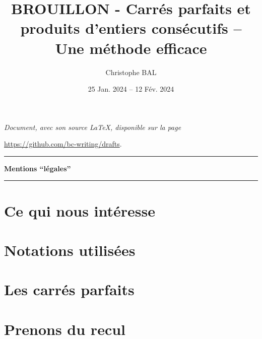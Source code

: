 \documentclass[12pt]{amsart}
\newcommand\contentdir{\jobname}
\begin{document}
\title{BROUILLON - Carrés parfaits et produits d'entiers consécutifs -- Une méthode efficace}
\author{Christophe BAL}
\date{25 Jan. 2024 -- 12 Fév. 2024}

\maketitle

\begin{center}
	\itshape
	Document, avec son source \LaTeX, disponible sur la page
	
	\url{https://github.com/bc-writing/drafts}.
\end{center}


\bigskip


\begin{center}
	\hrule\vspace{.3em}
	{
		\fontsize{1.35em}{1em}\selectfont
		\textbf{Mentions \enquote{légales}}
	}
			
	\vspace{0.45em}
	\small
	\doclicenseThis
	\hrule
\end{center}


\setcounter{tocdepth}{2}
\tableofcontents




\newpage
\section{Ce qui nous intéresse}






\section{Notations utilisées}






\section{Les carrés parfaits}







\newpage
\section{Prenons du recul}
\end{document}
